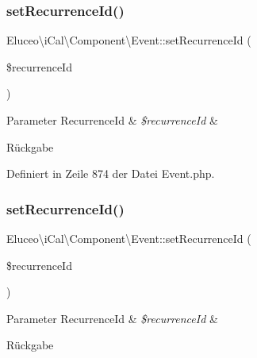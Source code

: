 \subsubsection{\texorpdfstring{set\+Recurrence\+Id()}{setRecurrenceId()}\hspace{0.1cm}{\footnotesize\ttfamily [2/3]}}
{\footnotesize\ttfamily Eluceo\textbackslash{}i\+Cal\textbackslash{}\+Component\textbackslash{}\+Event\+::set\+Recurrence\+Id (\begin{DoxyParamCaption}\item[{\mbox{\hyperlink{class_eluceo_1_1i_cal_1_1_property_1_1_event_1_1_recurrence_id}{Recurrence\+Id}}}]{\$recurrence\+Id }\end{DoxyParamCaption})}


\begin{DoxyParams}[1]{Parameter}
Recurrence\+Id & {\em \$recurrence\+Id} & \\
\hline
\end{DoxyParams}
\begin{DoxyReturn}{Rückgabe}

\end{DoxyReturn}


Definiert in Zeile 874 der Datei Event.\+php.

\mbox{\label{class_eluceo_1_1i_cal_1_1_component_1_1_event_a58f917ab89985fa449ad2cff85477d0a}} 
\subsubsection{\texorpdfstring{set\+Recurrence\+Id()}{setRecurrenceId()}\hspace{0.1cm}{\footnotesize\ttfamily [3/3]}}
{\footnotesize\ttfamily Eluceo\textbackslash{}i\+Cal\textbackslash{}\+Component\textbackslash{}\+Event\+::set\+Recurrence\+Id (\begin{DoxyParamCaption}\item[{\mbox{\hyperlink{class_eluceo_1_1i_cal_1_1_property_1_1_event_1_1_recurrence_id}{Recurrence\+Id}}}]{\$recurrence\+Id }\end{DoxyParamCaption})}


\begin{DoxyParams}[1]{Parameter}
Recurrence\+Id & {\em \$recurrence\+Id} & \\
\hline
\end{DoxyParams}
\begin{DoxyReturn}{Rückgabe}

\end{DoxyReturn}


